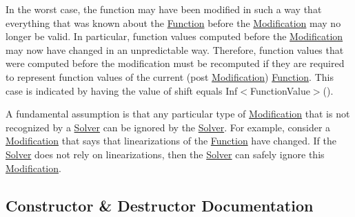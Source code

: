 In the worst case, the function may have been modified in such a way that everything that was known about the \mbox{\hyperlink{class_s_m_spp__di__unipi__it_1_1_function}{Function}} before the \mbox{\hyperlink{class_s_m_spp__di__unipi__it_1_1_modification}{Modification}} may no longer be valid. In particular, function values computed before the \mbox{\hyperlink{class_s_m_spp__di__unipi__it_1_1_modification}{Modification}} may now have changed in an unpredictable way. Therefore, function values that were computed before the modification must be recomputed if they are required to represent function values of the current (post \mbox{\hyperlink{class_s_m_spp__di__unipi__it_1_1_modification}{Modification}}) \mbox{\hyperlink{class_s_m_spp__di__unipi__it_1_1_function}{Function}}. This case is indicated by having the value of shift equals Inf$<$\+Function\+Value$>$().

A fundamental assumption is that any particular type of \mbox{\hyperlink{class_s_m_spp__di__unipi__it_1_1_modification}{Modification}} that is not recognized by a \mbox{\hyperlink{class_s_m_spp__di__unipi__it_1_1_solver}{Solver}} can be ignored by the \mbox{\hyperlink{class_s_m_spp__di__unipi__it_1_1_solver}{Solver}}. For example, consider a \mbox{\hyperlink{class_s_m_spp__di__unipi__it_1_1_modification}{Modification}} that says that linearizations of the \mbox{\hyperlink{class_s_m_spp__di__unipi__it_1_1_function}{Function}} have changed. If the \mbox{\hyperlink{class_s_m_spp__di__unipi__it_1_1_solver}{Solver}} does not rely on linearizations, then the \mbox{\hyperlink{class_s_m_spp__di__unipi__it_1_1_solver}{Solver}} can safely ignore this \mbox{\hyperlink{class_s_m_spp__di__unipi__it_1_1_modification}{Modification}}. 

\subsection{Constructor \& Destructor Documentation}
\mbox{\label{class_s_m_spp__di__unipi__it_1_1_function_mod_a311cc97015658a8f6479f754730c65ed}} 
